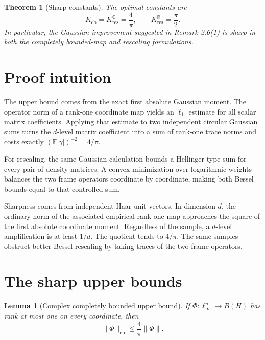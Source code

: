\documentclass[11pt]{article}
\newtheorem{theorem}{Theorem}
\newtheorem{lemma}{Lemma}
\newcommand{\C}{\mathbb C}
\newcommand{\R}{\mathbb R}
\begin{document}
\begin{theorem}[Sharp constants]\label{thm:main}
The optimal constants are
\[
 K_{\mathrm{cb}}=K_{\mathrm{res}}^{\C}=\frac4\pi,
 \qquad
 K_{\mathrm{res}}^{\R}=\frac\pi2.
\]
In particular, the Gaussian improvement suggested in Remark 2.6(1) is
sharp in both the completely bounded-map and rescaling formulations.
\end{theorem}

\section*{Proof intuition}

The upper bound comes from the exact first absolute Gaussian moment.  The
operator norm of a rank-one coordinate map yields an $\ell_1$ estimate for
all scalar matrix coefficients.  Applying that estimate to two independent
circular Gaussian sums turns the $d$-level matrix coefficient into a sum of
rank-one trace norms and costs exactly
$(\mathbb E|\gamma|)^{-2}=4/\pi$.

For rescaling, the same Gaussian calculation bounds a Hellinger-type sum for
every pair of density matrices.  A convex minimization over logarithmic
weights balances the two frame operators coordinate by coordinate, making
both Bessel bounds equal to that controlled sum.

Sharpness comes from independent Haar unit vectors.  In dimension $d$, the
ordinary norm of the associated empirical rank-one map approaches the square
of the first absolute coordinate moment.  Regardless of the sample, a
$d$-level amplification is at least $1/d$.  The quotient tends to $4/\pi$.
The same samples obstruct better Bessel rescaling by taking traces of the two
frame operators.

\section*{The sharp upper bounds}

\begin{lemma}[Complex completely bounded upper bound]\label{lem:cbupper}
If $\Phi:\ell_\infty^n\to B(H)$ has rank at most one on every coordinate,
then
\[
 \|\Phi\|_{\mathrm{cb}}\leq\frac4\pi\|\Phi\|.
\]
\end{lemma}
\end{document}
